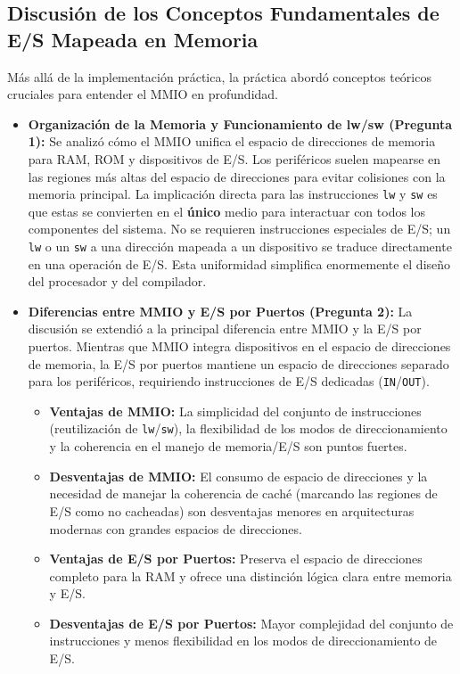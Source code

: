 \documentclass[12pt, a4paper]{article}
\begin{document}
\subsection*{Discusión de los Conceptos Fundamentales de E/S Mapeada en Memoria}
Más allá de la implementación práctica, la práctica abordó conceptos teóricos cruciales para entender el MMIO en profundidad.
\begin{itemize}
    \item \textbf{Organización de la Memoria y Funcionamiento de lw/sw (Pregunta 1):} Se analizó cómo el MMIO unifica el espacio de direcciones de memoria para RAM, ROM y dispositivos de E/S. Los periféricos suelen mapearse en las regiones más altas del espacio de direcciones para evitar colisiones con la memoria principal. La implicación directa para las instrucciones \texttt{lw} y \texttt{sw} es que estas se convierten en el \textbf{único} medio para interactuar con todos los componentes del sistema. No se requieren instrucciones especiales de E/S; un \texttt{lw} o un \texttt{sw} a una dirección mapeada a un dispositivo se traduce directamente en una operación de E/S. Esta uniformidad simplifica enormemente el diseño del procesador y del compilador.
    \item \textbf{Diferencias entre MMIO y E/S por Puertos (Pregunta 2):} La discusión se extendió a la principal diferencia entre MMIO y la E/S por puertos. Mientras que MMIO integra dispositivos en el espacio de direcciones de memoria, la E/S por puertos mantiene un espacio de direcciones separado para los periféricos, requiriendo instrucciones de E/S dedicadas (\texttt{IN}/\texttt{OUT}).
    \begin{itemize}
        \item \textbf{Ventajas de MMIO:} La simplicidad del conjunto de instrucciones (reutilización de \texttt{lw}/\texttt{sw}), la flexibilidad de los modos de direccionamiento y la coherencia en el manejo de memoria/E/S son puntos fuertes.
        \item \textbf{Desventajas de MMIO:} El consumo de espacio de direcciones y la necesidad de manejar la coherencia de caché (marcando las regiones de E/S como no cacheadas) son desventajas menores en arquitecturas modernas con grandes espacios de direcciones.
        \item \textbf{Ventajas de E/S por Puertos:} Preserva el espacio de direcciones completo para la RAM y ofrece una distinción lógica clara entre memoria y E/S.
        \item \textbf{Desventajas de E/S por Puertos:} Mayor complejidad del conjunto de instrucciones y menos flexibilidad en los modos de direccionamiento de E/S.

\end{itemize}
\end{itemize}
\end{document}
